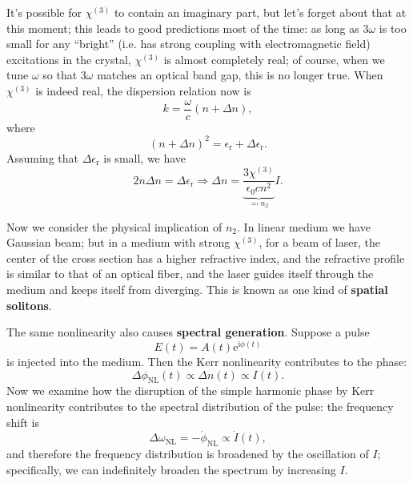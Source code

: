 \documentclass[hyperref, a4paper]{article}
\newcommand*{\ii}{\mathrm{i}}
\newcommand*{\ee}{\mathrm{e}}
\newcommand*{\concept}[1]{{\textbf{#1}}}
\newcommand{\epsr}{\epsilon_{\text{r}}}
\begin{document}
It's possible for $\chi^{(3)}$ to contain an imaginary part,
but let's forget about that at this moment;
this leads to good predictions most of the time:
as long as $3 \omega$ is too small for any 
``bright'' (i.e. has strong coupling with electromagnetic field) excitations 
in the crystal, 
$\chi^{(3)}$ is almost completely real; 
of course, when we tune $\omega$ so that $3 \omega$ 
matches an optical band gap, 
this is no longer true.
When $\chi^{(3)}$ is indeed real,
the dispersion relation now is 
\begin{equation}
    k = \frac{\omega}{c} (n + \Delta n),
\end{equation}
where 
\begin{equation}
    (n + \Delta n)^2 = \epsr + \Delta \epsr.
\end{equation}
Assuming that $\Delta \epsr$ is small, 
we have 
\begin{equation}
    2 n \Delta n = \Delta \epsr \Rightarrow 
    \Delta n = \underbrace{
        \frac{
        3 \chi^{(3)}
        }{\epsilon_0 c n^2}
    }_{\eqqcolon n_2} I.
\end{equation}

Now we consider the physical implication of $n_2$.
In linear medium we have Gaussian beam;
but in a medium with strong $\chi^{(3)}$,
for a beam of laser,
the center of the cross section has a higher refractive index, 
and the refractive profile is similar to that of an optical fiber, 
and the laser guides itself through the medium 
and keeps itself from diverging.
This is known as one kind of \concept{spatial solitons}.

The same nonlinearity also causes \concept{spectral generation}.
Suppose a pulse 
\begin{equation}
    E(t) = A(t) \ee^{\ii \phi(t)}
\end{equation}
is injected into the medium.
Then the Kerr nonlinearity contributes to the phase:
\begin{equation}
    \Delta \phi_{\text{NL}}(t) \propto \Delta n(t) \propto I(t).
\end{equation}
Now we examine how the disruption of the simple harmonic phase  
by Kerr nonlinearity contributes to the spectral distribution of the pulse:
the frequency shift is 
\begin{equation}
    \Delta \omega_{\text{NL}} = - \dot{\phi}_{\text{NL}}
    \propto \dot{I}(t),
\end{equation}
and therefore the frequency distribution is broadened 
by the oscillation of $I$;
specifically, we can indefinitely broaden the spectrum 
by increasing $I$.
\end{document}
